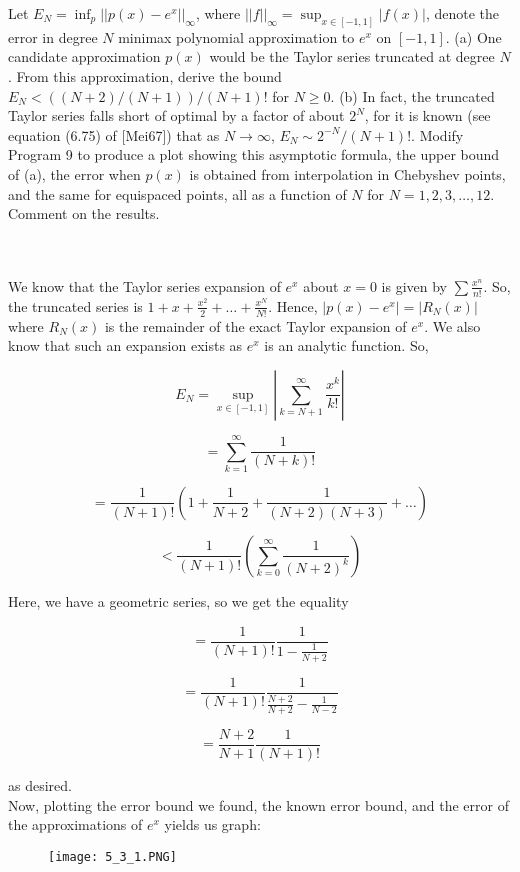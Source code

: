 Let $E_N = \inf_p||p(x)-e^x||_{\infty}$, where $||f||_{\infty}=\sup_{x\in[-1,1]}|f (x)|$, denote the error in
degree $N$ minimax polynomial approximation to $e^x$ on $[-1, 1]$. (a) One candidate approximation $p(x)$ would be
the Taylor series truncated at degree $N$. From this approximation, derive the bound $E_N<((N + 2)/(N + 1))/(N + 1)!$
for $N\geq0$. (b) In fact, the truncated Taylor series falls short of optimal by a factor of about $2^N$, 
for it is known (see equation (6.75) of [Mei67]) that as $N\rightarrow\infty$, $E_N\sim2^{-N}/(N + 1)!$. Modify
Program 9 to produce a plot showing this asymptotic formula, the upper bound of (a), the error when $p(x)$ is obtained 
from interpolation in Chebyshev points, and the same for equispaced points, all as a function of $N$ for
$N = 1, 2, 3,\ldots,12$. Comment on the results.\\\\

\begin{solution}\renewcommand{\qedsymbol}{}\ \\
    We know that the Taylor series expansion of $e^x$ about $x=0$ is given by $\sum\frac{x^n}{n!}$. So, the truncated
    series is $1+x+\frac{x^2}{2}+\ldots+\frac{x^N}{N!}$. Hence, $|p(x)-e^x|=|R_N(x)|$ where $R_N(x)$ is the remainder
    of the exact Taylor expansion of $e^x$. We also know that such an expansion exists as $e^x$ is an analytic function.
    So,

    $$E_N=\sup_{x\in[-1,1]}|\sum_{k=N+1}^{\infty}\frac{x^k}{k!}|$$

    $$=\sum_{k=1}^{\infty}\frac{1}{(N+k)!}$$

    $$=\frac{1}{(N+1)!}(1+\frac{1}{N+2}+\frac{1}{(N+2)(N+3)}+\dots)$$

    $$<\frac{1}{(N+1)!}(\sum_{k=0}^{\infty}\frac{1}{(N+2)^k})$$

    Here, we have a geometric series, so we get the equality

    $$=\frac{1}{(N+1)!}\frac{1}{1-\frac{1}{N+2}}$$

    $$=\frac{1}{(N+1)!}\frac{1}{\frac{N+2}{N+2}-\frac{1}{N-2}}$$

    $$=\frac{N+2}{N+1}\frac{1}{(N+1)!}$$

    as desired.\\

    Now, plotting the error bound we found, the known error bound, and the error of the approximations of $e^x$ yields us
    graph:

    \begin{figure}[htp]
        \centering
        \texttt{[image: 5\_3\_1.PNG]}
    \end{figure}

\end{solution}

\newpage

\newpage